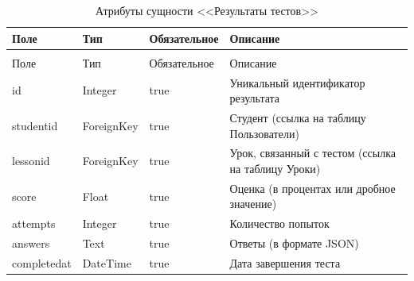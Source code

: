\begin{xltabular}{\textwidth}{|l|l|p{3.2cm}|X|}
	\caption{Атрибуты сущности <<Результаты тестов>>\label{test_results:table}}\\ \hline
	Поле & Тип & Обязательное & Описание \\ \hline
	\endfirsthead
	\\ \hline
	Поле & Тип & Обязательное & Описание \\ \hline
	\endhead
	id & Integer & true & Уникальный идентификатор результата \\ \hline
	studentid & ForeignKey & true & Студент (ссылка на таблицу Пользователи) \\ \hline
	lessonid & ForeignKey & true & Урок, связанный с тестом (ссылка на таблицу Уроки) \\ \hline
	score & Float & true & Оценка (в процентах или дробное значение) \\ \hline
	attempts & Integer & true & Количество попыток \\ \hline
	answers & Text & true & Ответы (в формате JSON) \\ \hline
	completedat & DateTime & true & Дата завершения теста \\ \hline
\end{xltabular}

